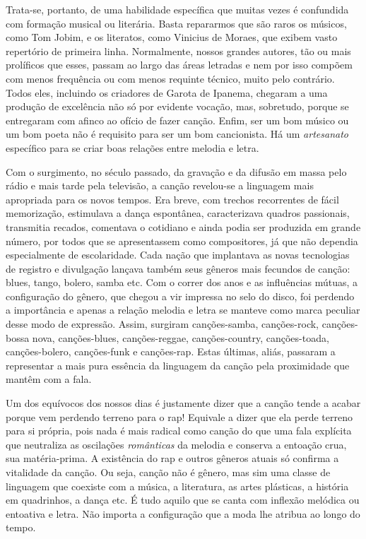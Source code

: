Trata-se, portanto, de uma habilidade específica que muitas vezes é
confundida com formação musical ou literária. Basta repararmos que são
raros os músicos, como Tom Jobim, e os literatos, como Vinicius de
Moraes, que exibem vasto repertório de primeira linha. Normalmente,
nossos grandes autores, tão ou mais prolíficos que esses, passam ao
largo das áreas letradas e nem por isso compõem com menos frequência ou
com menos requinte técnico, muito pelo contrário. Todos eles, incluindo
os criadores de Garota de Ipanema, chegaram a uma produção de excelência
não só por evidente vocação, mas, sobretudo, porque se entregaram com
afinco ao ofício de fazer canção. Enfim, ser um bom músico ou um bom
poeta não é requisito para ser um bom cancionista. Há um \textit{artesanato}
específico para se criar boas relações entre melodia e letra.

Com o surgimento, no século passado, da gravação e da difusão em massa
pelo rádio e mais tarde pela televisão, a canção revelou-se a linguagem
mais apropriada para os novos tempos. Era breve, com trechos recorrentes
de fácil memorização, estimulava a dança espontânea, caracterizava
quadros passionais, transmitia recados, comentava o cotidiano e ainda
podia ser produzida em grande número, por todos que se apresentassem
como compositores, já que não dependia especialmente de escolaridade.
Cada nação que implantava as novas tecnologias de registro e divulgação
lançava também seus gêneros mais fecundos de canção: blues, tango,
bolero, samba etc. Com o correr dos anos e as influências mútuas, a
configuração do gênero, que chegou a vir impressa no selo do disco, foi
perdendo a importância e apenas a relação melodia e letra se manteve
como marca peculiar desse modo de expressão. Assim, surgiram
canções-samba, canções-rock, canções-bossa nova, canções-blues,
canções-reggae, canções-country, canções-toada, canções-bolero, canções-funk e canções-rap. Estas últimas, aliás, passaram a representar a mais
pura essência da linguagem da canção pela proximidade que mantêm com a
fala.

Um dos equívocos dos nossos dias é justamente dizer que a canção tende a
acabar porque vem perdendo terreno para o rap! Equivale a dizer que ela
perde terreno para si própria, pois nada é mais radical como canção do
que uma fala explícita que neutraliza as oscilações \textit{românticas} da
melodia e conserva a entoação crua, sua matéria-prima. A existência do
rap e outros gêneros atuais só confirma a vitalidade da canção. Ou seja,
canção não é gênero, mas sim uma classe de linguagem que coexiste com a
música, a literatura, as artes plásticas, a história em quadrinhos, a
dança etc. É tudo aquilo que se canta com inflexão melódica ou
entoativa e letra. Não importa a configuração que a moda lhe atribua ao
longo do tempo.

